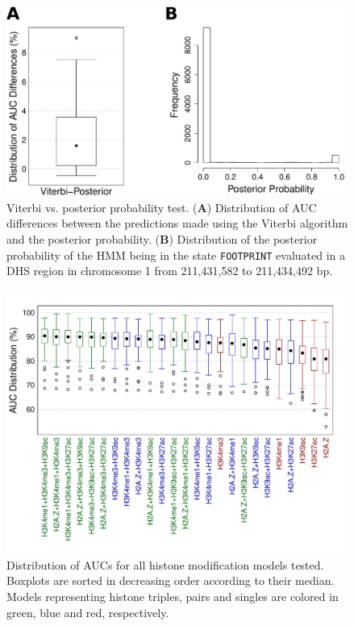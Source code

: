 \documentclass{bioinfo}
\begin{document}
\begin{figure}[t]
\centering
     \includegraphics[width=0.99\textwidth]{Figs/PosteriorTest}
\caption{Viterbi vs. posterior probability test. (\textbf{A}) Distribution of AUC differences between the predictions made using the Viterbi algorithm and the posterior probability. (\textbf{B}) Distribution of the posterior probability of the HMM being in the state {\tt FOOTPRINT} evaluated in a DHS region in chromosome 1 from 211,431,582 to 211,434,492 bp.}
\label{fig:posterior.test}
\end{figure}


\begin{figure}[t]
\centering
     \includegraphics[width=0.99\textwidth]{Figs/SignalTypeTest_boxplot}
\caption{Distribution of AUCs for all histone modification models tested. Boxplots are sorted in decreasing order according to their median. Models representing histone triples, pairs and singles are colored in green, blue and red, respectively.}
\label{fig:signaltype.box}
\end{figure}
\end{document}
